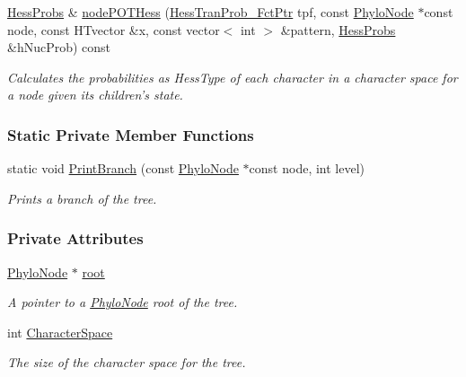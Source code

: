 \begin{DoxyCompactItemize}
\hyperlink{PhyloTree_8hpp_a8ee2b3678316ad48baa269e4ee7db7f7}{\-Hess\-Probs} \& \hyperlink{classPhyloTree_aec23a8f03330ad66e6ff1af4c886798e}{node\-P\-O\-T\-Hess} (\hyperlink{PhyloTree_8hpp_aa81a7e0d071642af42626caebfef6eeb}{\-Hess\-Tran\-Prob\-\_\-\-Fct\-Ptr} tpf, const \hyperlink{classPhyloNode}{\-Phylo\-Node} $\ast$const node, const \-H\-Tvector \&x, const vector$<$ int $>$ \&pattern, \hyperlink{PhyloTree_8hpp_a8ee2b3678316ad48baa269e4ee7db7f7}{\-Hess\-Probs} \&h\-Nuc\-Prob) const 
\begin{DoxyCompactList}\small\item\em \-Calculates the probabilities as \-Hess\-Type of each character in a character space for a node given its children's state. \end{DoxyCompactList}\end{DoxyCompactItemize}
\subsubsection*{\-Static \-Private \-Member \-Functions}
\begin{DoxyCompactItemize}
\item 
static void \hyperlink{classPhyloTree_a3e9c22f8a721a840c84f67e2136b8d30}{\-Print\-Branch} (const \hyperlink{classPhyloNode}{\-Phylo\-Node} $\ast$const node, int level)
\begin{DoxyCompactList}\small\item\em \-Prints a branch of the tree. \end{DoxyCompactList}\end{DoxyCompactItemize}
\subsubsection*{\-Private \-Attributes}
\begin{DoxyCompactItemize}
\item 
\hyperlink{classPhyloNode}{\-Phylo\-Node} $\ast$ \hyperlink{classPhyloTree_a38c3253751a7ed9ffacb0978106f8173}{root}
\begin{DoxyCompactList}\small\item\em \-A pointer to a \hyperlink{classPhyloNode}{\-Phylo\-Node} root of the tree. \end{DoxyCompactList}\item 
int \hyperlink{classPhyloTree_a2411ce76565644f8253f15840863a05a}{\-Character\-Space}
\begin{DoxyCompactList}\small\item\em \-The size of the character space for the tree. \end{DoxyCompactList}\end{DoxyCompactItemize}


